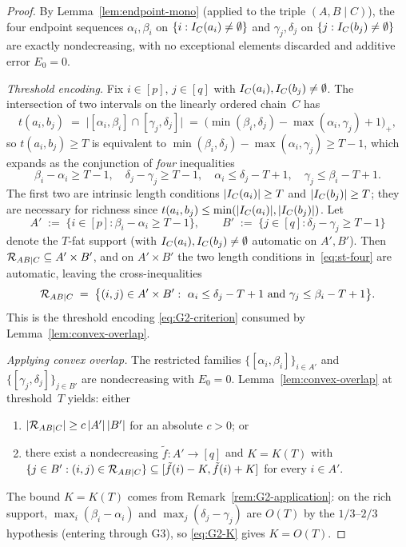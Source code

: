 \begin{proof}
By Lemma~\ref{lem:endpoint-mono} (applied to the triple $(A,B\mid C)$), the
four endpoint sequences $\alpha_i,\beta_i$ on $\{i:I_C(a_i)\ne\emptyset\}$
and $\gamma_j,\delta_j$ on $\{j:I_C(b_j)\ne\emptyset\}$ are exactly
nondecreasing, with no exceptional elements discarded and additive error
$E_0=0$.

\smallskip
\noindent\emph{Threshold encoding.} Fix $i\in[p]$, $j\in[q]$ with
$I_C(a_i),I_C(b_j)\ne\emptyset$. The intersection of two intervals on the
linearly ordered chain~$C$ has
\[
  t(a_i,b_j)\;=\;\big|[\alpha_i,\beta_i]\cap[\gamma_j,\delta_j]\big|
  \;=\;\big(\min(\beta_i,\delta_j)-\max(\alpha_i,\gamma_j)+1\big)_+,
\]
so $t(a_i,b_j)\ge T$ is equivalent to
$\min(\beta_i,\delta_j)-\max(\alpha_i,\gamma_j)\ge T-1$, which expands as the
conjunction of \emph{four} inequalities
\begin{equation}\label{eq:st-four}
  \beta_i-\alpha_i\ge T-1,\quad
  \delta_j-\gamma_j\ge T-1,\quad
  \alpha_i\le\delta_j-T+1,\quad
  \gamma_j\le\beta_i-T+1.
\end{equation}
The first two are intrinsic length conditions $|I_C(a_i)|\ge T$ and
$|I_C(b_j)|\ge T$; they are necessary for richness since
$t(a_i,b_j)\le\min(|I_C(a_i)|,|I_C(b_j)|)$. Let
\[
  A'\;:=\;\{i\in[p]:\beta_i-\alpha_i\ge T-1\},\qquad
  B'\;:=\;\{j\in[q]:\delta_j-\gamma_j\ge T-1\}
\]
denote the $T$-fat support (with $I_C(a_i),I_C(b_j)\ne\emptyset$ automatic on
$A',B'$). Then $\mathcal{R}_{AB\mid C}\subseteq A'\times B'$, and on $A'\times B'$
the two length conditions in~\eqref{eq:st-four} are automatic, leaving the
cross-inequalities
\begin{equation}\label{eq:st-two}
  \Rich_{AB\mid C}\;=\;\big\{(i,j)\in A'\times B':\ \alpha_i\le\delta_j-T+1\ \text{and}\ \gamma_j\le\beta_i-T+1\big\}.
\end{equation}
This is the threshold encoding \eqref{eq:G2-criterion} consumed by
Lemma~\ref{lem:convex-overlap}.

\smallskip
\noindent\emph{Applying convex overlap.} The restricted families
$\{[\alpha_i,\beta_i]\}_{i\in A'}$ and $\{[\gamma_j,\delta_j]\}_{j\in B'}$ are
nondecreasing with $E_0=0$. Lemma~\ref{lem:convex-overlap} at threshold~$T$
yields: either
\begin{enumerate}[nosep,label=(\alph*)]
  \item $|\mathcal{R}_{AB\mid C}|\ge c\,|A'|\,|B'|$ for an absolute $c>0$; or
  \item there exist a nondecreasing $\tilde f:A'\to[q]$ and $K=K(T)$ with
  $\{j\in B':(i,j)\in\mathcal{R}_{AB\mid C}\}\subseteq[\tilde f(i)-K,\tilde f(i)+K]$
  for every $i\in A'$.
\end{enumerate}
The bound $K=K(T)$ comes from Remark~\ref{rem:G2-application}: on the rich
support, $\max_i(\beta_i-\alpha_i)$ and $\max_j(\delta_j-\gamma_j)$ are $O(T)$
by the $1/3$--$2/3$ hypothesis (entering through G3), so \eqref{eq:G2-K}
gives $K=O(T)$.


\end{proof}
